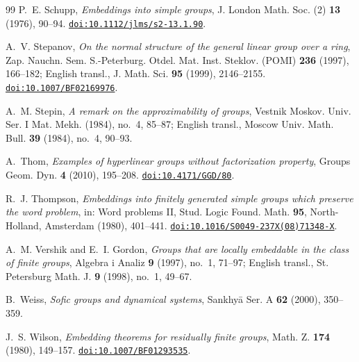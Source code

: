 \documentclass[11pt]{amsart}
\newcommand{\doi}[1]{\href{https://doi.org/#1}{\nolinkurl{doi:#1}}}
\begin{document}
\begin{thebibliography}{99}
P.~E. Schupp, \emph{Embeddings into simple groups},
J. London Math. Soc. (2) \textbf{13} (1976), 90--94.
\doi{10.1112/jlms/s2-13.1.90}.

A.~V. Stepanov, \emph{On the normal structure of the general linear
group over a ring}, Zap. Nauchn. Sem. S.-Peterburg. Otdel. Mat. Inst. Steklov. (POMI) \textbf{236} (1997), 166--182;
English transl., J. Math. Sci. \textbf{95} (1999), 2146--2155.
\doi{10.1007/BF02169976}.

A.~M. Stepin, \emph{A remark on the approximability of groups},
Vestnik Moskov. Univ. Ser. I Mat. Mekh. (1984), no.~4, 85--87;
English transl., Moscow Univ. Math. Bull. \textbf{39} (1984), no.~4, 90--93.

A.~Thom, \emph{Examples of hyperlinear groups without factorization
property}, Groups Geom. Dyn. \textbf{4} (2010), 195--208.
\doi{10.4171/GGD/80}.

R.~J. Thompson, \emph{Embeddings into finitely generated simple groups
which preserve the word problem}, in: Word problems II, Stud. Logic Found.
Math. \textbf{95}, North-Holland, Amsterdam (1980), 401--441.
\doi{10.1016/S0049-237X(08)71348-X}.

A.~M. Vershik and E.~I. Gordon,
\emph{Groups that are locally embeddable in the class of finite groups},
Algebra i Analiz \textbf{9} (1997), no.~1, 71--97; English transl.,
St. Petersburg Math. J. \textbf{9} (1998), no.~1, 49--67.

B.~Weiss, \emph{Sofic groups and dynamical systems}, Sankhy\={a} Ser. A
\textbf{62} (2000), 350--359.

J.~S. Wilson, \emph{Embedding theorems for residually finite groups},
Math. Z. \textbf{174} (1980), 149--157.
\doi{10.1007/BF01293535}.

\end{thebibliography}
\end{document}
